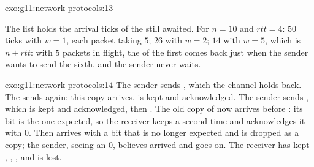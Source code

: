 \begin{solution}{exo:g11:network-protocols:13}
\smallskip\noindent\hspace*{2em}

\noindent\hspace*{4em}

\noindent\hspace*{4em}

\noindent\hspace*{6em}

\noindent\hspace*{6em}

\noindent\hspace*{8em}

\noindent\hspace*{8em}

\noindent\hspace*{6em}

\noindent\hspace*{4em}

\smallskip\noindent The list holds the arrival ticks of the  still awaited. For $n = 10$ and
$\mathit{rtt} = 4$: $50$ ticks with $w = 1$, each packet taking $5$; $26$ with $w = 2$; $14$ with $w = 5$, which is
$n + \mathit{rtt}$: with $5$ packets in flight, the  of the first comes back just when the sender
wants to send the sixth, and the sender never waits.
\end{solution}

\begin{solution}{exo:g11:network-protocols:14}
The sender sends , which the channel holds back. The  sends  again; this copy
arrives, is kept and acknowledged. The sender sends , which is kept and acknowledged, then .
The old copy of  now arrives before : its bit is the one expected, so the receiver keeps
 a second time and acknowledges it with $0$. Then  arrives with a bit that is no longer expected
and is dropped as a copy; the sender, seeing an  $0$, believes  arrived and goes on. The
receiver has kept , , , and  is lost.
\end{solution}

